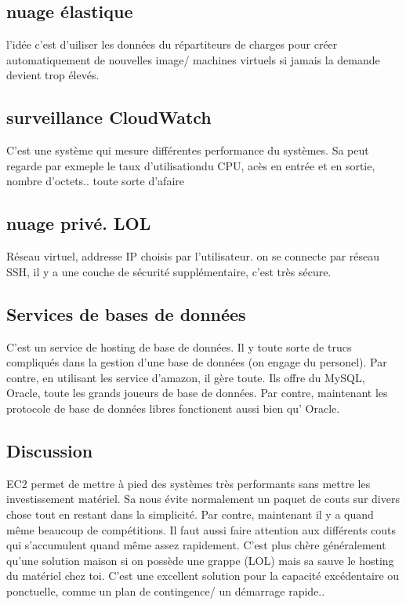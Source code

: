 \documentclass[oneside]{book}
\begin{document}
\subsection{nuage élastique}
l'idée c'est d'uiliser les données du répartiteurs de charges pour créer automatiquement de nouvelles image/ machines virtuels si jamais la demande devient trop élevés.

\subsection{surveillance CloudWatch}
C'est une système qui mesure différentes performance du systèmes. Sa peut regarde par exmeple le taux d'utilisationdu CPU, acès en entrée et en sortie, nombre d'octets.. toute sorte d'afaire

\subsection{nuage privé. LOL}
Réseau virtuel, addresse IP choisis par l'utilisateur. on se connecte par réseau SSH, il y a une couche de sécurité supplémentaire, c'est très sécure. 

\subsection{Services de bases de données}
C'est un service de hosting de base de données. Il y toute sorte de trucs compliqués dans la gestion d'une base de données (on engage du personel). Par contre, en utilisant les service d'amazon, il gère toute. Ils offre du MySQL, Oracle, toute les grands joueurs de base de données. Par contre, maintenant les protocole de base de données libres fonctionent aussi bien qu' Oracle.

\subsection{Discussion}
EC2 permet de mettre à pied des systèmes très performants sans mettre les investissement matériel. Sa nous évite normalement un paquet de couts sur divers chose tout en restant dans la simplicité. Par contre, maintenant il y a quand même beaucoup de compétitions. Il faut aussi faire attention aux différents couts qui s'accumulent quand même assez rapidement. C'est plus chère généralement qu'une solution maison si on possède une grappe (LOL) mais sa sauve le hosting du matériel chez toi. C'est une excellent solution pour la capacité excédentaire ou ponctuelle, comme un plan de contingence/ un démarrage rapide..
\end{document}
